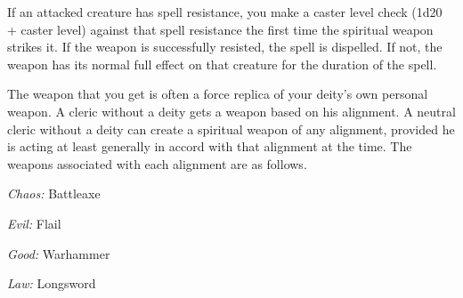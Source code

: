 {	If an attacked creature has spell resistance, you make a caster level check (1d20 + caster level) against that spell resistance the first time the spiritual weapon strikes it. If the weapon is successfully resisted, the spell is dispelled. If not, the weapon has its normal full effect on that creature for the duration of the spell.

	The weapon that you get is often a force replica of your deity's own personal weapon. A cleric without a deity gets a weapon based on his alignment. A neutral cleric without a deity can create a spiritual weapon of any alignment, provided he is acting at least generally in accord with that alignment at the time. The weapons associated with each alignment are as follows.

	\textit{Chaos:}
	Battleaxe

	\textit{Evil:}
Flail

	\textit{Good:}
	Warhammer

	\textit{Law:}
	Longsword

}
